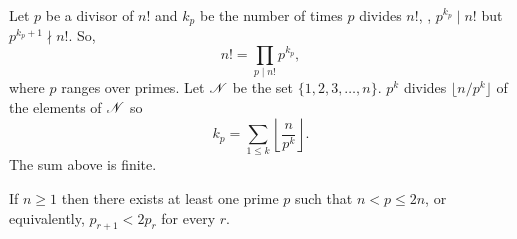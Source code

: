 Let $p$ be a divisor of $n!$ and $k_p$ be the number of times $p$
divides $n!$, \ie, $p^{k_p} \mid n!$ but $p^{k_p +1} \nmid n!$.  So,
\[
n! = \prod_{p \mid  n!} p^{k_p},
\]
where $p$ ranges over primes.
Let ${\cal N}$ be the set $\{1, 2, 3, \ldots, n\}$.  $p^k$ divides
$\lfloor n/p^k \rfloor$ of the elements of ${\cal N}$ so
\begin{equation}\label{Factor:Div:Eq}
k_p = \sum_{1 \le k} \left\lfloor \frac{n}{p^k} \right\rfloor.
\end{equation}
The sum above is finite.

\begin{proposition}\label{Bertrands:Post:Prop}
If $n \ge 1$ then there exists at least one prime $p$ such that $n < p
\le 2n$, or equivalently, $p_{r+1} < 2 p_r$ for every $r$.
\end{proposition}

